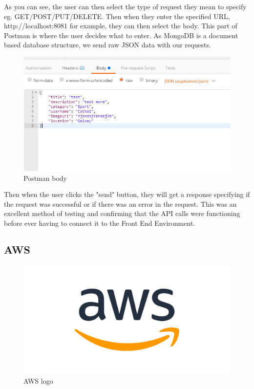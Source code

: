\par As you can see, the user can then select the type of request they mean to specify eg. GET/POST/PUT/DELETE. Then when they enter the specified URL, http://localhost:8081 for example, they can then select the body. This part of Postman is where the user decides what to enter. As MongoDB is a document based database structure, we send raw JSON data with our requests. \par

\begin{figure}[bh]
\renewcommand\thefigure{3.12}
\centering
\includegraphics[scale = 0.8]{img/postman-JSON.PNG}
\caption{Postman body}
\label{PostmanBody}
\end{figure}

Then when the user clicks the "send" button, they will get a response specifying if the request was successful or if there was an error in the request. This was an excellent method of testing and confirming that the API calls were functioning before ever having to connect it to the Front End Environment.

\subsection{AWS}

\begin{figure}[h]
\renewcommand\thefigure{3.13}
\centering
\includegraphics[scale = 0.3]{img/aws_logo_smile_1200x630.png}
\caption{AWS logo}
\label{AWSLogo}
\end{figure}

